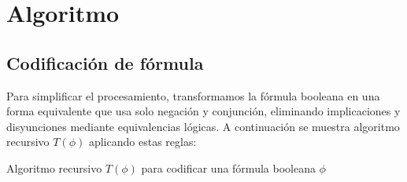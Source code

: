\documentclass{report}
\begin{document}
	\section{Algoritmo}
	\subsection{Codificación de fórmula}
	Para simplificar el procesamiento, transformamos la fórmula booleana en una forma equivalente que usa solo negación y conjunción, eliminando implicaciones y disyunciones mediante equivalencias lógicas.
	A continuación se muestra algoritmo recursivo $T(\phi)$ aplicando estas reglas:
	\begin{algorithm}
		\caption{Algoritmo recursivo $T(\phi)$ para codificar una fórmula booleana $\phi$}
		\KwIn{$\phi$}
	\end{algorithm}
\end{document}
